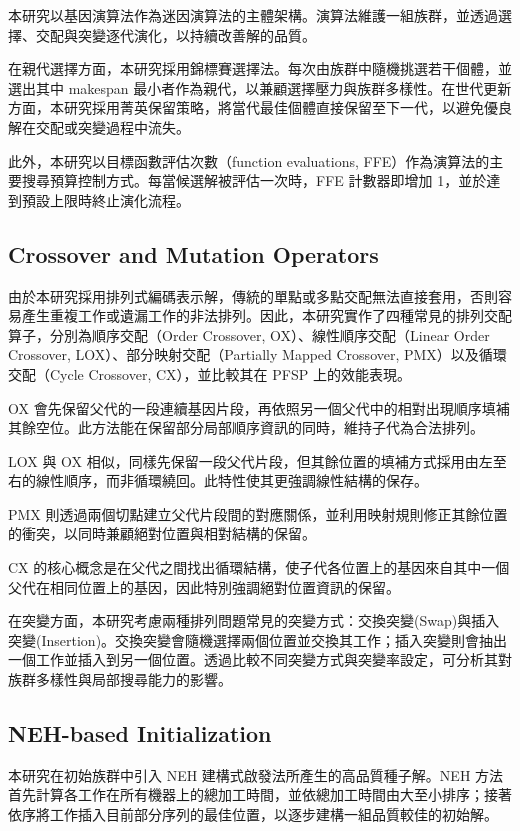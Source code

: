 \documentclass[conference]{IEEEtran}
\begin{document}
本研究以基因演算法作為迷因演算法的主體架構。演算法維護一組族群，並透過選擇、交配與突變逐代演化，以持續改善解的品質。

在親代選擇方面，本研究採用錦標賽選擇法。每次由族群中隨機挑選若干個體，並選出其中 makespan 最小者作為親代，以兼顧選擇壓力與族群多樣性。在世代更新方面，本研究採用菁英保留策略，將當代最佳個體直接保留至下一代，以避免優良解在交配或突變過程中流失。

此外，本研究以目標函數評估次數（function evaluations, FFE）作為演算法的主要搜尋預算控制方式。每當候選解被評估一次時，FFE 計數器即增加 1，並於達到預設上限時終止演化流程。
\subsection{Crossover and Mutation Operators}
由於本研究採用排列式編碼表示解，傳統的單點或多點交配無法直接套用，否則容易產生重複工作或遺漏工作的非法排列。因此，本研究實作了四種常見的排列交配算子，分別為順序交配（Order Crossover, OX）、線性順序交配（Linear Order Crossover, LOX）、部分映射交配（Partially Mapped Crossover, PMX）以及循環交配（Cycle Crossover, CX），並比較其在 PFSP 上的效能表現。

OX 會先保留父代的一段連續基因片段，再依照另一個父代中的相對出現順序填補其餘空位。此方法能在保留部分局部順序資訊的同時，維持子代為合法排列。

LOX 與 OX 相似，同樣先保留一段父代片段，但其餘位置的填補方式採用由左至右的線性順序，而非循環繞回。此特性使其更強調線性結構的保存。

PMX 則透過兩個切點建立父代片段間的對應關係，並利用映射規則修正其餘位置的衝突，以同時兼顧絕對位置與相對結構的保留。

CX 的核心概念是在父代之間找出循環結構，使子代各位置上的基因來自其中一個父代在相同位置上的基因，因此特別強調絕對位置資訊的保留。

在突變方面，本研究考慮兩種排列問題常見的突變方式：交換突變(Swap)與插入突變(Insertion)。交換突變會隨機選擇兩個位置並交換其工作；插入突變則會抽出一個工作並插入到另一個位置。透過比較不同突變方式與突變率設定，可分析其對族群多樣性與局部搜尋能力的影響。

\subsection{NEH-based Initialization}
本研究在初始族群中引入 NEH 建構式啟發法所產生的高品質種子解。NEH 方法首先計算各工作在所有機器上的總加工時間，並依總加工時間由大至小排序；接著依序將工作插入目前部分序列的最佳位置，以逐步建構一組品質較佳的初始解。
\end{document}

